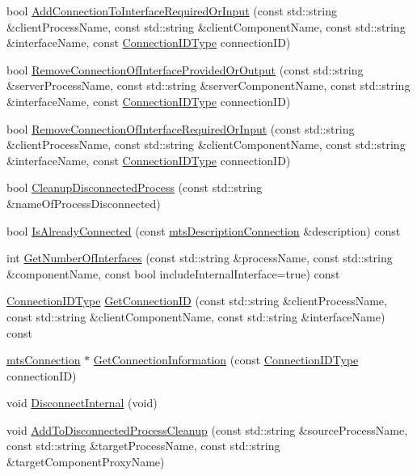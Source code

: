 \begin{DoxyCompactItemize}
\item 
bool \hyperlink{classmts_manager_global_abbcbd4b173b16bb526bd6ac3381aa91b}{Add\-Connection\-To\-Interface\-Required\-Or\-Input} (const std\-::string \&client\-Process\-Name, const std\-::string \&client\-Component\-Name, const std\-::string \&interface\-Name, const \hyperlink{mts_forward_declarations_8h_ad3543bb11742e1766374ec96016d6547}{Connection\-I\-D\-Type} connection\-I\-D)
\item 
bool \hyperlink{classmts_manager_global_a81e63fe6a44457f8e867dfeb85a3247d}{Remove\-Connection\-Of\-Interface\-Provided\-Or\-Output} (const std\-::string \&server\-Process\-Name, const std\-::string \&server\-Component\-Name, const std\-::string \&interface\-Name, const \hyperlink{mts_forward_declarations_8h_ad3543bb11742e1766374ec96016d6547}{Connection\-I\-D\-Type} connection\-I\-D)
\item 
bool \hyperlink{classmts_manager_global_acaa9d8d96ff161094790ccfa9e6e3336}{Remove\-Connection\-Of\-Interface\-Required\-Or\-Input} (const std\-::string \&client\-Process\-Name, const std\-::string \&client\-Component\-Name, const std\-::string \&interface\-Name, const \hyperlink{mts_forward_declarations_8h_ad3543bb11742e1766374ec96016d6547}{Connection\-I\-D\-Type} connection\-I\-D)
\item 
bool \hyperlink{classmts_manager_global_a115d9b7e7e1b0125977ac0f737484537}{Cleanup\-Disconnected\-Process} (const std\-::string \&name\-Of\-Process\-Disconnected)
\item 
bool \hyperlink{classmts_manager_global_ab6db0d6f1e9d0717199bdbfdce5141e5}{Is\-Already\-Connected} (const \hyperlink{classmts_description_connection}{mts\-Description\-Connection} \&description) const 
\item 
int \hyperlink{classmts_manager_global_a0e3e1f31090dfa4288608b611bd5c723}{Get\-Number\-Of\-Interfaces} (const std\-::string \&process\-Name, const std\-::string \&component\-Name, const bool include\-Internal\-Interface=true) const 
\item 
\hyperlink{mts_forward_declarations_8h_ad3543bb11742e1766374ec96016d6547}{Connection\-I\-D\-Type} \hyperlink{classmts_manager_global_a1305debbb9848297d7f8079506c6ad75}{Get\-Connection\-I\-D} (const std\-::string \&client\-Process\-Name, const std\-::string \&client\-Component\-Name, const std\-::string \&interface\-Name) const 
\item 
\hyperlink{classmts_connection}{mts\-Connection} $\ast$ \hyperlink{classmts_manager_global_abd5b0c5b4f749c26628273f6adc92f9c}{Get\-Connection\-Information} (const \hyperlink{mts_forward_declarations_8h_ad3543bb11742e1766374ec96016d6547}{Connection\-I\-D\-Type} connection\-I\-D)
\item 
void \hyperlink{classmts_manager_global_ab3b98061820480cd58a6707adc549bd0}{Disconnect\-Internal} (void)
\item 
void \hyperlink{classmts_manager_global_a0404d7f1f8b8dba08ca0bc305251f851}{Add\-To\-Disconnected\-Process\-Cleanup} (const std\-::string \&source\-Process\-Name, const std\-::string \&target\-Process\-Name, const std\-::string \&target\-Component\-Proxy\-Name)
\end{DoxyCompactItemize}
